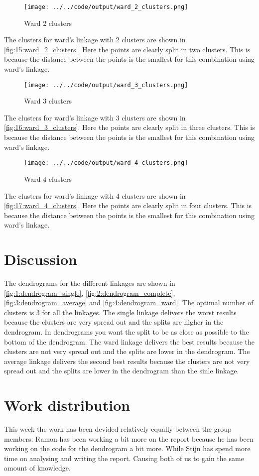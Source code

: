 \documentclass[twoside, a4paper, fleqn, reqno]{article}
\begin{document}
\begin{figure}[H]
	\centering
	\texttt{[image: ../../code/output/ward\_2\_clusters.png]}
	\caption{Ward 2 clusters}
	\label{fig:15:ward_2_clusters}
\end{figure}

The clusters for ward's linkage with 2 clusters are shown in \autoref{fig:15:ward_2_clusters}.
Here the points are clearly split in two clusters.
This is because the distance between the points is the smallest for this combination using ward's linkage.

\begin{figure}[H]
	\centering
	\texttt{[image: ../../code/output/ward\_3\_clusters.png]}
	\caption{Ward 3 clusters}
	\label{fig:16:ward_3_clusters}
\end{figure}

The clusters for ward's linkage with 3 clusters are shown in \autoref{fig:16:ward_3_clusters}.
Here the points are clearly split in three clusters.
This is because the distance between the points is the smallest for this combination using ward's linkage.

\begin{figure}[H]
	\centering
	\texttt{[image: ../../code/output/ward\_4\_clusters.png]}
	\caption{Ward 4 clusters}
	\label{fig:17:ward_4_clusters}
\end{figure}

The clusters for ward's linkage with 4 clusters are shown in \autoref{fig:17:ward_4_clusters}.
Here the points are clearly split in four clusters.
This is because the distance between the points is the smallest for this combination using ward's linkage.

\section{Discussion}

The dendrograms for the different linkages are shown in \autoref{fig:1:dendrogram_single}, \autoref{fig:2:dendrogram_complete}, \autoref{fig:3:dendrogram_average} and \autoref{fig:4:dendrogram_ward}.
The optimal number of clusters is 3 for all the linkages.
The single linkage delivers the worst results because the clusters are very spread out and the splits are higher in the dendrogram.
In dendrograms you want the split to be as close as possible to the bottom of the dendrogram.
The ward linkage delivers the best results because the clusters are not very spread out and the splits are lower in the dendrogram.
The average linkage delivers the second best results because the clusters are not very spread out and the splits are lower in the dendrogram than the sinle linkage.

\section{Work distribution}

This week the work has been devided relatively equally between the group members.
Ramon has been working a bit more on the report because he has been working on the code for the dendrogram a bit more.
While Stijn has spend more time on analysing and writing the report. Causing both of us to gain the same amount of knowledge.
\end{document}
